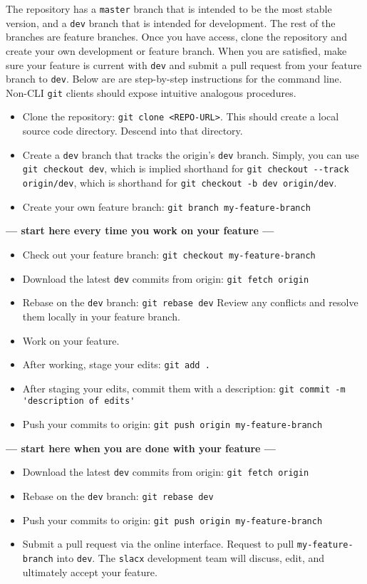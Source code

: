 The repository has a \verb|master| branch that is intended to be the most stable version,
and a \verb|dev| branch that is intended for development.
The rest of the branches are feature branches.
Once you have access, clone the repository
and create your own development or feature branch.
When you are satisfied, make sure your feature is current with \verb|dev|
and submit a pull request from your feature branch to \verb|dev|.
Below are are step-by-step instructions for the command line.
Non-CLI \verb|git| clients should expose intuitive analogous procedures.

\begin{itemize} 
\item Clone the repository: \verb|git clone <REPO-URL>|.
    This should create a local source code directory.
    Descend into that directory.
\item Create a \verb|dev| branch that tracks the origin's \verb|dev| branch.
    Simply, you can use \verb|git checkout dev|, which is implied shorthand for
    \verb|git checkout --track origin/dev|, which is shorthand for
    \verb|git checkout -b dev origin/dev|. 
\item Create your own feature branch: \verb|git branch my-feature-branch| 
\end{itemize} 
\textbf{--- start here every time you work on your feature ---}
\begin{itemize} 
\item Check out your feature branch: \verb|git checkout my-feature-branch|
\item Download the latest \verb|dev| commits from origin: \verb|git fetch origin| 
\item Rebase on the \verb|dev| branch: \verb|git rebase dev|
    Review any conflicts and resolve them locally in your feature branch.
\item Work on your feature.
\item After working, stage your edits: \verb|git add .|
\item After staging your edits, commit them with a description: 
    \verb|git commit -m 'description of edits'|
\item Push your commits to origin: \verb|git push origin my-feature-branch|
\end{itemize} 
\textbf{--- start here when you are done with your feature ---}
\begin{itemize} 
\item Download the latest \verb|dev| commits from origin: \verb|git fetch origin| 
\item Rebase on the \verb|dev| branch: \verb|git rebase dev|
\item Push your commits to origin: \verb|git push origin my-feature-branch|
\item Submit a pull request via the online interface.
    Request to pull \verb|my-feature-branch| into \verb|dev|.
    The \verb|slacx| development team will discuss, edit, 
    and ultimately accept your feature.
\end{itemize} 

